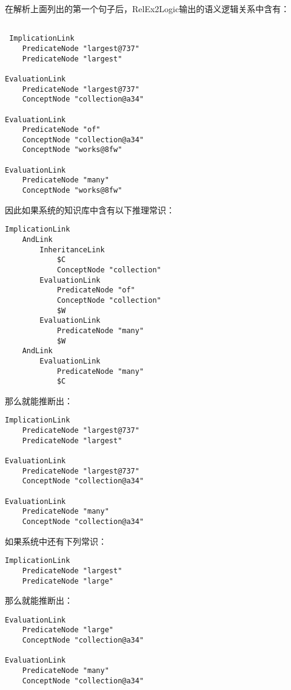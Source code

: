 在解析上面列出的第一个句子后，RelEx2Logic输出的语义逻辑关系中含有：

 {\tt\begin{small}\begin{lstlisting}

 ImplicationLink
 	PredicateNode "largest@737"
	PredicateNode "largest"

EvaluationLink
	PredicateNode "largest@737"
	ConceptNode "collection@a34"
	
EvaluationLink
	PredicateNode "of"
	ConceptNode "collection@a34"
	ConceptNode "works@8fw"
	
EvaluationLink
	PredicateNode "many"
	ConceptNode "works@8fw"
\end{lstlisting}\end{small}}

\noindent 因此如果系统的知识库中含有以下推理常识：

{\tt\begin{small}\begin{lstlisting}
ImplicationLink
	AndLink
		InheritanceLink
			$C
			ConceptNode "collection"
		EvaluationLink
			PredicateNode "of"
			ConceptNode "collection"
			$W
		EvaluationLink
			PredicateNode "many"
			$W
	AndLink
		EvaluationLink
			PredicateNode "many"
			$C
 \end{lstlisting}\end{small}}

\noindent 那么就能推断出：

 {\tt\begin{small}\begin{lstlisting}
ImplicationLink
 	PredicateNode "largest@737"
	PredicateNode "largest"

EvaluationLink
	PredicateNode "largest@737"
	ConceptNode "collection@a34"
	
EvaluationLink
	PredicateNode "many"
	ConceptNode "collection@a34"
\end{lstlisting}\end{small}}

\noindent 如果系统中还有下列常识：

 {\tt\begin{small}\begin{lstlisting}
ImplicationLink
	PredicateNode "largest"
	PredicateNode "large"
\end{lstlisting}\end{small}}

\noindent 那么就能推断出：

 {\tt\begin{small}\begin{lstlisting}
EvaluationLink
	PredicateNode "large"
	ConceptNode "collection@a34"
	
EvaluationLink
	PredicateNode "many"
	ConceptNode "collection@a34"
\end{lstlisting}\end{small}}

